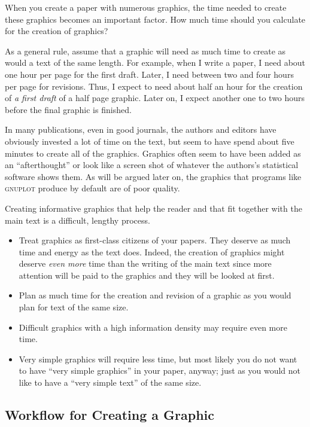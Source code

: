 When you create a paper with numerous graphics, the time needed to create these
graphics becomes an important factor. How much time should you calculate for
the creation of graphics?

As a general rule, assume that a graphic will need as much time to create as
would a text of the same length. For example, when I write a paper, I need
about one hour per page for the first draft. Later, I need between two and four
hours per page for revisions. Thus, I expect to need about half an hour for the
creation of \emph{a first draft} of a half page graphic. Later on, I expect
another one to two hours before the final graphic is finished.

In many publications, even in good journals, the authors and editors have
obviously  invested a lot of time on the text, but seem to have spend about
five minutes to create all of the graphics. Graphics often seem to have been
added as an ``afterthought'' or look like a screen shot of whatever the
authors's statistical software shows them. As will be argued later on, the
graphics that programs like \textsc{gnuplot} produce by default are of poor
quality.

Creating informative graphics that help the reader and that fit together with
the main text is a difficult, lengthy process.
%
\begin{itemize}
    \item Treat graphics as first-class citizens of your papers. They deserve
        as much time and energy as the text does. Indeed, the creation of
        graphics might deserve \emph{even more} time than the writing of the
        main text since more attention will  be paid to the graphics and they
        will be looked at first.
    \item Plan as much time for the creation and revision of a graphic as you
        would plan for text of the same size.
    \item Difficult graphics with a high information density may require even
        more time.
    \item Very simple graphics will require less time, but most likely you do
        not want to have ``very simple graphics'' in your paper, anyway; just
        as you would not like to have a ``very simple text'' of the same
        size.
\end{itemize}


\subsection{Workflow for Creating a Graphic}

